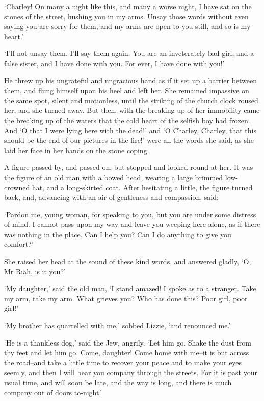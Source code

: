 ‘Charley! On many a night like this, and many a worse night, I have sat
on the stones of the street, hushing you in my arms. Unsay those words
without even saying you are sorry for them, and my arms are open to you
still, and so is my heart.’

‘I’ll not unsay them. I’ll say them again. You are an inveterately bad
girl, and a false sister, and I have done with you. For ever, I have
done with you!’

He threw up his ungrateful and ungracious hand as if it set up a barrier
between them, and flung himself upon his heel and left her. She remained
impassive on the same spot, silent and motionless, until the striking
of the church clock roused her, and she turned away. But then, with the
breaking up of her immobility came the breaking up of the waters that
the cold heart of the selfish boy had frozen. And ‘O that I were lying
here with the dead!’ and ‘O Charley, Charley, that this should be the
end of our pictures in the fire!’ were all the words she said, as she
laid her face in her hands on the stone coping.

A figure passed by, and passed on, but stopped and looked round at
her. It was the figure of an old man with a bowed head, wearing a large
brimmed low-crowned hat, and a long-skirted coat. After hesitating a
little, the figure turned back, and, advancing with an air of gentleness
and compassion, said:

‘Pardon me, young woman, for speaking to you, but you are under some
distress of mind. I cannot pass upon my way and leave you weeping here
alone, as if there was nothing in the place. Can I help you? Can I do
anything to give you comfort?’

She raised her head at the sound of these kind words, and answered
gladly, ‘O, Mr Riah, is it you?’

‘My daughter,’ said the old man, ‘I stand amazed! I spoke as to a
stranger. Take my arm, take my arm. What grieves you? Who has done this?
Poor girl, poor girl!’

‘My brother has quarrelled with me,’ sobbed Lizzie, ‘and renounced me.’

‘He is a thankless dog,’ said the Jew, angrily. ‘Let him go. Shake the
dust from thy feet and let him go. Come, daughter! Come home with me--it
is but across the road--and take a little time to recover your peace and
to make your eyes seemly, and then I will bear you company through the
streets. For it is past your usual time, and will soon be late, and the
way is long, and there is much company out of doors to-night.’

